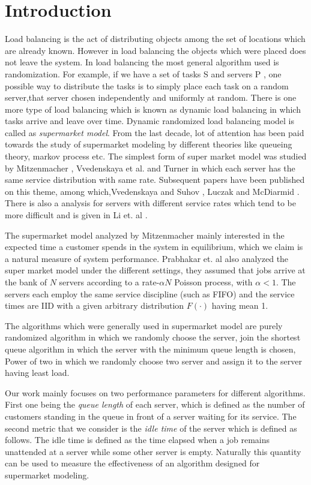 \documentclass[a4paper,english,12pt]{article}
\begin{document}
\section{Introduction}
Load balancing is the act of distributing objects among the set of locations which are already known. However in load balancing the objects which were placed does not leave the system. In load balancing the most general algorithm used is randomization. For example, if we have a set of tasks S and servers P , one possible way to distribute the tasks is to simply place each task on a random server,that server chosen independently and uniformly at random. There is one more type of load balancing which is known as dynamic load balancing in which tasks arrive and leave over time. Dynamic randomized load balancing model is called as \textit{supermarket model}.
From the last decade, lot of attention has been paid towards the study of supermarket modeling by different theories like queueing theory, markov process etc. The simplest form of super market model was studied by Mitzenmacher \cite{Mitzenmacher}, Vvedenskaya et al.\cite{Vv} and Turner \cite{Turner} in which  each server has the same service distribution with same rate. Subsequent papers have been published on this theme, among which,Vvedenskaya and Suhov \cite{VvSu}, Luczak and McDiarmid \cite{Luczak}. There is also a analysis for servers with different service rates which tend to be more difficult and is given in Li et. al \cite{Li}.
\par The supermarket model analyzed by Mitzenmacher mainly  interested in the expected time a customer spends in the system in equilibrium, which we claim is a natural measure of system performance. Prabhakar et. al \cite{Prabhakar} also analyzed the super market model under the different settings, they assumed that jobs arrive at the bank of $N$ servers according to a rate-$\alpha N$ Poisson
process, with $\alpha < 1$. The servers each employ the same service discipline (such as FIFO) and the service times are IID with a given arbitrary distribution $F(·)$ having mean 1.
\par The algorithms which were generally used in supermarket model are purely randomized algorithm in which we randomly choose the server, join the shortest queue algorithm in which the server with the minimum queue length is chosen, Power of two in which we randomly choose two server and assign it to the server having least load.
\par Our work mainly focuses on two performance parameters for different algorithms. First one being the \textit{queue length} of each server, which is defined as the number of customers standing in the queue in front of a server waiting for its service. The second metric that we consider is the \textit{idle time} of the server which is defined as follows. The idle time is defined as the time elapsed when a job remains unattended at a server while some other server is empty. Naturally this quantity can be used to measure the effectiveness of an algorithm designed for supermarket modeling. 
\end{document}
